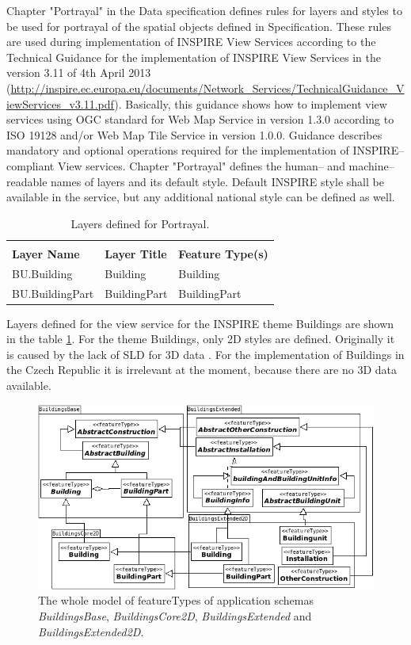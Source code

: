 \documentclass[eprint]{actapoly}
\begin{document}
Chapter "Portrayal" in the Data specification defines rules for layers and styles to be used for portrayal of the spatial objects defined in Specification. These rules are used during implementation of INSPIRE View Services according to the Technical Guidance for the implementation of INSPIRE View Services in the version 3.11 of 4th April 2013 (\url{http://inspire.ec.europa.eu/documents/Network_Services/TechnicalGuidance_ViewServices_v3.11.pdf}). Basically, this guidance shows how to implement view services using OGC standard for Web Map Service in version 1.3.0 according to ISO 19128 and/or Web Map Tile Service in version 1.0.0. Guidance describes mandatory and optional operations required for the implementation of INSPIRE--compliant View services. Chapter "Portrayal" defines the human-- and machine--readable names of layers and its default style. Default INSPIRE style shall be available in the service, but any additional national style can be defined as well.

\begin{table}
\centering
\begin{tabular}{lll}
\toprule\\
\bfseries Layer Name & \bfseries Layer Title & \bfseries Feature Type(s)
\\\Midrule
BU.Building & Building & Building
\\\midrule
BU.BuildingPart & BuildingPart & BuildingPart
\\\bottomrule
\end{tabular}
\caption{Layers defined for Portrayal.}
\label{tab:layers}
\end{table}

Layers defined for the view service for the INSPIRE theme Buildings are shown in the table \ref{tab:layers}. For the theme Buildings, only 2D styles are defined. Originally it is caused by the lack of SLD for 3D data \cite{INSPIRE:DSBU}. For the implementation of Buildings in the Czech Republic it is irrelevant at the moment, because there are no 3D data available.

\begin{figure}
\centering
\includegraphics[width=0.8\linewidth]{pics/Buildings.png} %
\caption{The whole model of featureTypes of application schemas \textit{BuildingsBase}, \textit{BuildingsCore2D}, \textit{BuildingsExtended} and \textit{BuildingsExtended2D}.}
\label{fig:bu_features}
\end{figure}
\end{document}
